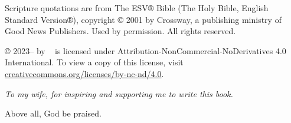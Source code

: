 \documentclass[twoside,a5paper,10pt,openright]{memoir}
\begin{document}
\vspace{0.5cm}
{
\footnotesize\noindent
Scripture quotations are from The ESV® Bible (The Holy Bible, English Standard Version®),
copyright © 2001 by Crossway, a publishing ministry of Good News Publishers. Used by
permission. All rights reserved.
}

\vspace{0.5cm}
{
\footnotesize\noindent
\thetitle{} © 2023--\the\year{} by \theauthor{}~ is licensed under
Attribution-NonCommercial-NoDerivatives 4.0 International. To view a copy of this license,
visit
\href{http://creativecommons.org/licenses/by-nc-nd/4.0/}{creativecommons.org/licenses/by-nc-nd/4.0}.
}

\thispagestyle{empty}
\newpage

\thispagestyle{empty}

\begin{center}
  \vspace{0.2\textheight}
  \itshape
  To my wife, for inspiring and supporting me to write this book.

  \vfill
  \raggedleft Above all, God be praised.
\end{center}

\newpage

\thispagestyle{empty}
\phantom{foo}
\newpage

\tableofcontents
\thispagestyle{empty}



% 

\mainmatter










\renewcommand{\theHchapter}{A\arabic{chapter}} %
\appendix


\backmatter
\printbibliography
\printglossary
\end{document}

